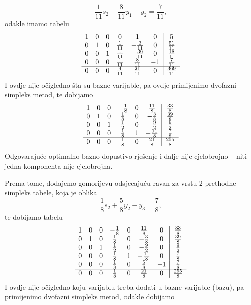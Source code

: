 \documentclass[a4paper, utf8, 11pt, colorlinks]{book}
\begin{document}
 $$ \frac{1}{11} s_2 + \frac{8}{11} y_1 - y_2 = \frac{7}{11},$$
 odakle imamo tabelu 
 $$\begin{array}{cccccc| c}
 1   &   0   &  0  &   0             &   1  &   0              &   5 \\
 0   &   1   &  0  &  \frac{1}{11}    &   -\frac{3}{11}    &  0 & \frac{51}{11} \\
 0   &   0   &  1  &  \frac{1}{11}    & -\frac{36}{11}       & 0 & \frac{18}{11}  \\
 0   &   0   &  0  &  \frac{1}{11}    &  \frac{8}{11}   & -1 & \frac{7}{11} \\ \hline
 0   &   0   &  0  &   \frac{4}{11}   &   \frac{21}{11} & 0 & \frac{369}{11}
\end{array} $$
I ovdje nije očigledno šta su bazne varijable, pa ovdje primijenimo dvofazni simpleks metod, te dobijamo 
 $$\begin{array}{cccccc| c}
1    &   0   &   0   &  -\frac{1}{8}   &   0    &    \frac{11}{8}    &  \frac{33}{8} \\
0    &   1   &   0   &   \frac{1}{8}   &   0    &    -\frac{3}{8}    & \frac{39}{8} \\
0    &   0   &   1   &   \frac{1}{2}   &   0    &    - \frac{9}{2}   & \frac{9}{2} \\
0    &   0   &   0   &   \frac{1}{8}   &   1    &    - \frac{11}{8}  & \frac{7}{8} \\ \hline
0    &   0   &   0   &   \frac{1}{8}   &   0    &     \frac{21}{8}   & \frac{255}{8}
\end{array} $$
Odgovarajuće optimalno bazno dopustivo rješenje i dalje nije cjelobrojno -- niti jedna komponenta nije cjelobrojna. 

Prema tome, dodajemo gomorijevu odsjecajuću ravan za vrstu 2 prethodne simpleks tabele, koja je oblika
$$  \frac{1}{8}s_2 + \frac{5}{8} y_2 - y_3 = \frac{7}{8},$$
te dobijamo tabelu
$$ \begin{array}{ccccccc| c}
1    &   0   &   0   &  -\frac{1}{8}   &   0    &    \frac{11}{8}    & 0 & \frac{33}{8} \\
0    &   1   &   0   &   \frac{1}{8}   &   0    &    -\frac{3}{8}    & 0 & \frac{39}{8} \\
0    &   0   &   1   &   \frac{1}{2}   &   0    &    - \frac{9}{2}   & 0 & \frac{9}{2} \\
0    &   0   &   0   &   \frac{1}{8}   &   1    &    - \frac{11}{8}  & 0    & \frac{7}{8} \\ 
0    &   0   &   0   &   \frac{1}{8}   &   0    &    \frac{5}{8}     & -1 & \frac{7}{8} \\ \hline
0    &   0   &   0   &   \frac{1}{8}   &   0    &     \frac{21}{8}   & 0 & \frac{255}{8}   
\end{array} $$
I ovdje nije očigledno koju   varijablu treba dodati u bazne varijable (bazu), pa primijenimo dvofazni simpleks metod, odakle dobijamo 
\end{document}
